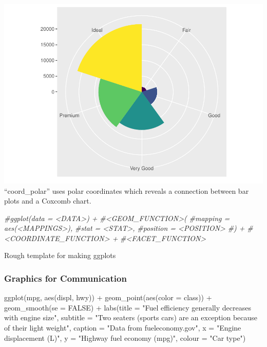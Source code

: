 \documentclass[
]{article}
\newenvironment{Shaded}{\begin{snugshade}}{\end{snugshade}}
\newcommand{\AttributeTok}[1]{\textcolor[rgb]{0.77,0.63,0.00}{#1}}
\newcommand{\CommentTok}[1]{\textcolor[rgb]{0.56,0.35,0.01}{\textit{#1}}}
\newcommand{\ConstantTok}[1]{\textcolor[rgb]{0.00,0.00,0.00}{#1}}
\newcommand{\FunctionTok}[1]{\textcolor[rgb]{0.00,0.00,0.00}{#1}}
\newcommand{\NormalTok}[1]{#1}
\newcommand{\SpecialCharTok}[1]{\textcolor[rgb]{0.00,0.00,0.00}{#1}}
\newcommand{\StringTok}[1]{\textcolor[rgb]{0.31,0.60,0.02}{#1}}
\begin{document}
\includegraphics{Assignments_files/figure-latex/unnamed-chunk-55-2.pdf}
``coord\_polar'' uses polar coordinates which reveals a connection
between bar plots and a Coxcomb chart.

\begin{Shaded}
\begin{Highlighting}[]
\CommentTok{\#ggplot(data = \textless{}DATA\textgreater{}) + }
  \CommentTok{\#\textless{}GEOM\_FUNCTION\textgreater{}(}
     \CommentTok{\#mapping = aes(\textless{}MAPPINGS\textgreater{}),}
     \CommentTok{\#stat = \textless{}STAT\textgreater{}, }
     \CommentTok{\#position = \textless{}POSITION\textgreater{}}
  \CommentTok{\#) +}
  \CommentTok{\#\textless{}COORDINATE\_FUNCTION\textgreater{} +}
  \CommentTok{\#\textless{}FACET\_FUNCTION\textgreater{}}
\end{Highlighting}
\end{Shaded}

Rough template for making ggplots

\hypertarget{graphics-for-communication}{%
\subsubsection{Graphics for
Communication}\label{graphics-for-communication}}

\begin{Shaded}
\begin{Highlighting}[]
\FunctionTok{ggplot}\NormalTok{(mpg, }\FunctionTok{aes}\NormalTok{(displ, hwy)) }\SpecialCharTok{+}
  \FunctionTok{geom\_point}\NormalTok{(}\FunctionTok{aes}\NormalTok{(}\AttributeTok{color =}\NormalTok{ class)) }\SpecialCharTok{+}
  \FunctionTok{geom\_smooth}\NormalTok{(}\AttributeTok{se =} \ConstantTok{FALSE}\NormalTok{) }\SpecialCharTok{+}
  \FunctionTok{labs}\NormalTok{(}\AttributeTok{title =} \StringTok{"Fuel efficiency generally decreases with engine size"}\NormalTok{,}
    \AttributeTok{subtitle =} \StringTok{"Two seaters (sports cars) are an exception because of their light weight"}\NormalTok{,}
    \AttributeTok{caption =} \StringTok{"Data from fueleconomy.gov"}\NormalTok{,}
    \AttributeTok{x =} \StringTok{"Engine displacement (L)"}\NormalTok{,}
    \AttributeTok{y =} \StringTok{"Highway fuel economy (mpg)"}\NormalTok{,}
    \AttributeTok{colour =} \StringTok{"Car type"}\NormalTok{)}
\end{Highlighting}
\end{Shaded}
\end{document}
